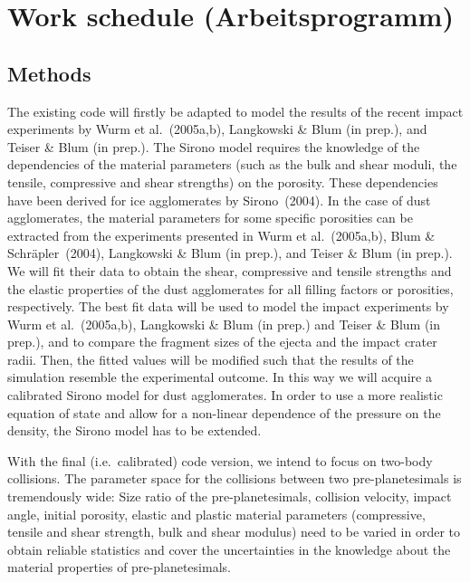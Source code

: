 \section{Work schedule (Arbeitsprogramm)}
%
\subsection{Methods}
%
%
The existing code will firstly be adapted to model the results of the recent
impact experiments by Wurm et al.~(2005a,b), Langkowski \& Blum (in prep.),
and Teiser \& Blum (in prep.). The Sirono model requires the knowledge of
the dependencies of the material parameters (such as the bulk and shear
moduli, the tensile, compressive and shear strengths) on the porosity. These
dependencies have been derived for ice agglomerates by Sirono~(2004). In the
case of dust agglomerates, the material parameters for some specific
porosities can be extracted from the experiments presented in Wurm et
al.~(2005a,b), Blum \& Schr\"apler~(2004), Langkowski \& Blum (in prep.),
and Teiser \& Blum (in prep.). We will fit their data to obtain the shear,
compressive and tensile strengths and the elastic properties of the dust
agglomerates for all filling factors or porosities, respectively. The best
fit data will be used to model the impact experiments by Wurm et
al.~(2005a,b), Langkowski \& Blum (in prep.) and Teiser \& Blum (in prep.),
and to compare the fragment sizes of the ejecta and the impact crater
radii. Then, the fitted values will be modified such that the results of the
simulation resemble the experimental outcome.  In this way we will acquire a
calibrated Sirono model for dust agglomerates.  In order to use a more
realistic equation of state and allow for a non-linear dependence of the
pressure on the density, the Sirono model has to be extended.

With the final (i.e.\ calibrated) code version, we intend to focus on
two-body collisions. The parameter space for the collisions between two
pre-planetesimals is tremendously wide: Size ratio of the pre-planetesimals,
collision velocity, impact angle, initial porosity, elastic and plastic
material parameters (compressive, tensile and shear strength, bulk and shear
modulus) need to be varied in order to obtain reliable statistics and cover
the uncertainties in the knowledge about the material properties of
pre-planetesimals.

